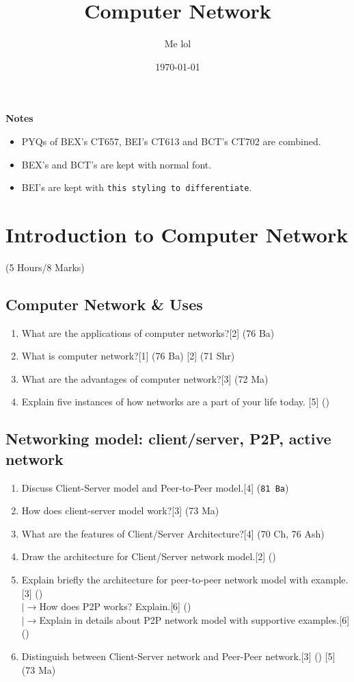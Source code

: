 \documentclass[12pt]{article}
\title{Computer Network}
\author{Me lol}
\date{\today}
\newcommand{\lb}{\\$\left|\rightarrow\right.$}
\begin{document}
\maketitle
\vspace{13cm}
\begin{large}\textbf{Notes}\end{large}
\begin{itemize}
\item PYQs of BEX's CT657, BEI's CT613 and BCT's CT702 are combined.
\item BEX's and BCT's are kept with normal font.\item BEI's are kept with \texttt{this styling to differentiate}.
\end{itemize}
\pagebreak
\tableofcontents
\pagebreak

\section{Introduction to Computer Network}
	\begin{center}(5 Hours/8 Marks)\end{center}
	\subsection{Computer Network \& Uses}
		\begin{enumerate}[noitemsep, topsep = 0pt]
			\item What are the applications of computer networks?\hfill[2] (76 Ba)
			\item What is computer network?\hfill[1] (76 Ba) [2] (71 Shr)
			\item What are the advantages of computer network?\hfill[3] (72 Ma)
			\item Explain five instances of how networks are a part of your life today. \hfill [5] ()
		\end{enumerate}

	\subsection{Networking model: client/server, P2P, active network}
		\begin{enumerate}[noitemsep, topsep = 0pt]
			\item Discuss Client-Server model and Peer-to-Peer model.\hfill[4] (\texttt{81 Ba})
			\item How does client-server model work?\hfill[3] (73 Ma)
			\item What are the features of Client/Server Architecture?\hfill[4] (70 Ch, 76 Ash)
			\item Draw the architecture for Client/Server network model.\hfill[2] ()
			\item Explain briefly the architecture for peer-to-peer network model with example.\hfill[3] ()
			\lb How does P2P works? Explain.\hfill[6] ()
			\lb Explain in details about P2P network model with supportive examples.\hfill[6] ()
			\item Distinguish between Client-Server network and Peer-Peer network.\hfill[3] () [5] (73 Ma)
		\end{enumerate}
\end{document}
